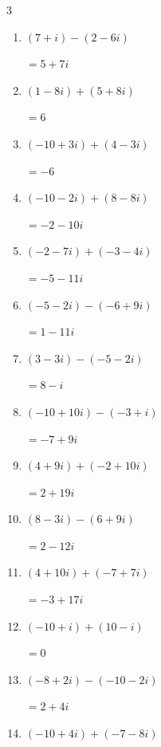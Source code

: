 \begin{multicols}{3}
\begin{enumerate}
  \item $\displaystyle (7+i) - (2-6i)$

        $\displaystyle =5+7i$

  \item $\displaystyle (1-8i) + (5+8i)$

        $\displaystyle =6$

  \item $\displaystyle (-10+3i) + (4-3i)$

        $\displaystyle =-6$

  \item $\displaystyle (-10-2i) + (8-8i)$

        $\displaystyle =-2-10i$

  \item $\displaystyle (-2-7i) + (-3-4i)$

        $\displaystyle =-5-11i$

  \item $\displaystyle (-5-2i) - (-6+9i)$

        $\displaystyle =1-11i$

  \item $\displaystyle (3-3i) - (-5-2i)$

        $\displaystyle =8-i$

  \item $\displaystyle (-10+10i) - (-3+i)$

        $\displaystyle =-7+9i$

\columnbreak %

  \item $\displaystyle (4+9i) + (-2+10i)$

        $\displaystyle =2+19i$

  \item $\displaystyle (8-3i) - (6+9i)$

        $\displaystyle =2-12i$

  \item $\displaystyle (4+10i) + (-7+7i)$

        $\displaystyle =-3+17i$

  \item $\displaystyle (-10+i) + (10-i)$

        $\displaystyle =0$

  \item $\displaystyle (-8+2i) - (-10-2i)$

        $\displaystyle =2+4i$

  \item $\displaystyle (-10+4i) + (-7-8i)$


\end{enumerate}
\end{multicols}
